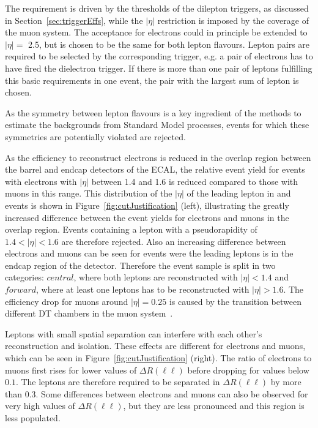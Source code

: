 The \pt requirement is driven by the thresholds of the dilepton triggers, as discussed in Section~\ref{sec:triggerEffs}, while the $|\eta|$ restriction is imposed  by the coverage of the muon system. The acceptance for electrons could in principle be extended to $|\eta| =$ 2.5, but is chosen to be the same for both lepton flavours. Lepton pairs are required to be selected by the corresponding trigger, e.g. a pair of electrons has to have fired the dielectron trigger. If there is more than one pair of leptons fulfilling this basic requirements in one event, the pair with the largest sum of lepton \pt is chosen. 

As the symmetry between lepton flavours is a key ingredient of the methods to estimate the backgrounds from Standard Model processes, events for which these symmetries are potentially violated are rejected.

As the efficiency to reconstruct electrons is reduced in the overlap region between the barrel and endcap detectors of the ECAL, the relative event yield for events with electrons with $|\eta|$ between 1.4 and 1.6 is reduced compared to those with muons in this range. This distribution of the $|\eta|$ of the leading lepton in \EE and  \MM events is shown in Figure~\ref{fig:cutJustification} (left), illustrating the greatly increased difference between the event yields for electrons and muons in the overlap region. Events containing a lepton with a pseudorapidity of $1.4<|\eta|<1.6$ are therefore rejected. Also an increasing difference between electrons and muons can be seen for events were the leading leptons is in the endcap region of the detector. Therefore the event sample is split in two categories: $\textit{central}$, where both leptons are reconstructed with $|\eta| < 1.4$ and $\textit{forward}$, where at least one leptons has to be reconstructed with $|\eta| > 1.6$. The efficiency drop for muons around $|\eta| = 0.25$ is caused by the transition between different DT chambers in the muon system~\cite{CMS}.

Leptons with small spatial separation can interfere with each other's reconstruction and isolation. These effects are different for electrons and muons, which can be seen in Figure~\ref{fig:cutJustification} (right). The ratio of electrons to muons first rises for lower values of $\Delta R(\ell\ell)$ before dropping for values below $0.1$. The leptons are therefore required to be separated in $\Delta R(\ell\ell)$ by more than 0.3. Some differences between electrons and muons can also be observed for very high values of $\Delta R(\ell\ell)$, but they are less pronounced and this region is less populated.  

